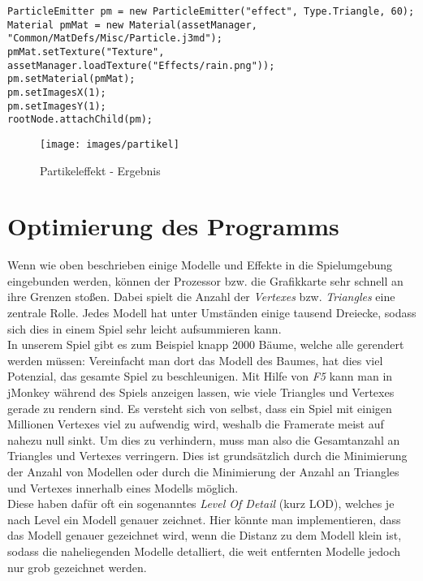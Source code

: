 \begin{lstlisting}
ParticleEmitter pm = new ParticleEmitter("effect", Type.Triangle, 60);
Material pmMat = new Material(assetManager, "Common/MatDefs/Misc/Particle.j3md");
pmMat.setTexture("Texture", assetManager.loadTexture("Effects/rain.png"));
pm.setMaterial(pmMat);
pm.setImagesX(1);
pm.setImagesY(1);
rootNode.attachChild(pm);
\end{lstlisting}

\begin{figure}[H]
	\myfloatalign
	\caption{Partikeleffekt - Ergebnis}
	
	\texttt{[image: images/partikel]} 
	
\end{figure}

\pagebreak

\section{Optimierung des Programms}\label{sec:optimizing}
Wenn wie oben beschrieben einige Modelle und Effekte in die Spielumgebung eingebunden werden, können der Prozessor bzw. die Grafikkarte sehr schnell an ihre Grenzen stoßen. Dabei spielt die Anzahl der \emph{Vertexes} bzw. \emph{Triangles} eine zentrale Rolle. Jedes Modell hat unter Umständen einige tausend Dreiecke, sodass sich dies in einem Spiel sehr leicht aufsummieren kann. \\
In unserem Spiel gibt es zum Beispiel knapp 2000 Bäume, welche alle gerendert werden müssen: Vereinfacht man dort das Modell des Baumes, hat dies viel Potenzial, das gesamte Spiel zu beschleunigen. Mit Hilfe von \emph{F5} kann man in jMonkey während des Spiels anzeigen lassen, wie viele Triangles und Vertexes gerade zu rendern sind. Es versteht sich von selbst, dass ein Spiel mit einigen Millionen Vertexes viel zu aufwendig wird, weshalb die Framerate meist auf nahezu null sinkt. Um dies zu verhindern, muss man also die Gesamtanzahl an Triangles und Vertexes verringern. Dies ist grundsätzlich durch die Minimierung der Anzahl von Modellen oder durch die Minimierung der Anzahl an Triangles und Vertexes innerhalb eines Modells möglich. \\
Diese haben dafür oft ein sogenanntes \emph{Level Of Detail} (kurz LOD), welches je nach Level ein Modell genauer zeichnet. Hier könnte man implementieren, dass das Modell genauer gezeichnet wird, wenn die Distanz zu dem Modell klein ist, sodass die naheliegenden Modelle detalliert, die weit entfernten Modelle jedoch nur grob gezeichnet werden.

